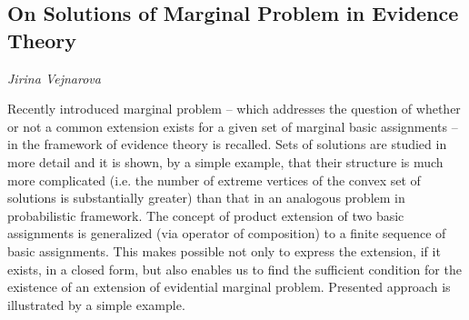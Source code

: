 \documentclass[../booklet.tex]{subfiles}
\begin{document}
\subsection[On Solutions of Marginal Problem in Evidence Theory. {\it Jirina Vejnarova}]{On Solutions of Marginal Problem in Evidence Theory}

\begin{center}
  {\it Jirina Vejnarova}
\end{center}

\vskip 0.8cm


Recently introduced marginal problem -- which addresses the question
of whether or not a common extension exists for a given set of
marginal basic assignments -- in the framework of evidence theory is
recalled. Sets of solutions are studied in more detail and it is
shown, by a simple example, that their structure is much more
complicated (i.e. the number of extreme vertices of the convex set
of solutions is substantially greater) than that in an analogous
problem in probabilistic framework. The concept of product extension
of two basic assignments is generalized (via operator of
composition) to a finite sequence of basic assignments. This makes
possible not only to express the extension, if it exists, in a
closed form, but also enables us to find the sufficient condition
for the existence of an extension of evidential marginal problem.
Presented approach is illustrated by a simple example.

\end{document}

